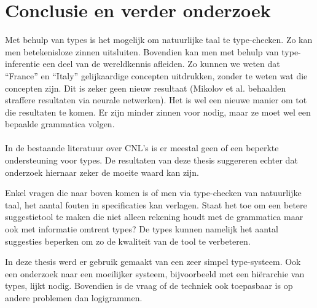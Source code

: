 \section{Conclusie en verder onderzoek}
Met behulp van types is het mogelijk om natuurlijke taal te type-checken. Zo kan men betekenisloze zinnen uitsluiten. Bovendien kan men met behulp van type-inferentie een deel van de wereldkennis afleiden. Zo kunnen we weten dat ``France'' en ``Italy'' gelijkaardige concepten uitdrukken, zonder te weten wat die concepten zijn. Dit is zeker geen nieuw resultaat (Mikolov et al. \cite{Mikolov2013} behaalden straffere resultaten via neurale netwerken). Het is wel een nieuwe manier om tot die resultaten te komen. Er zijn minder zinnen voor nodig, maar ze moet wel een bepaalde grammatica volgen.

\paragraph{} In de bestaande literatuur over CNL's is er meestal geen of een beperkte ondersteuning voor types. De resultaten van deze thesis suggereren echter dat onderzoek hiernaar zeker de moeite waard kan zijn.

Enkel vragen die naar boven komen is of men via type-checken van natuurlijke taal, het aantal fouten in specificaties kan verlagen. Staat het toe om een betere suggestietool te maken die niet alleen rekening houdt met de grammatica maar ook met informatie omtrent types? De types kunnen namelijk het aantal suggesties beperken om zo de kwaliteit van de tool te verbeteren.

In deze thesis werd er gebruik gemaakt van een zeer simpel type-systeem. Ook een onderzoek naar een moeilijker systeem, bijvoorbeeld met een hiërarchie van types, lijkt nodig. Bovendien is de vraag of de techniek ook toepasbaar is op andere problemen dan logigrammen.
